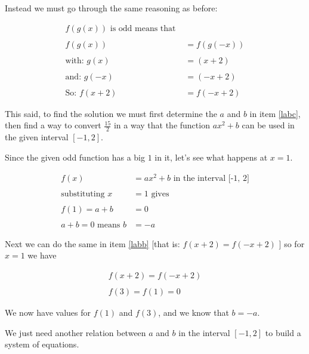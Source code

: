 \begin{enumerate}
Instead we must go through the same reasoning as before:

\begin{equation}
\begin{split}
f(g(x))\textrm{ is odd means that }\\
\\
f(g(x))&=f(g(-x))\\
\\
\textrm{with: } g(x)&=(x+2)\\
\\
\textrm{and: } g(-x)&=(-x+2)\\
\\
\textrm{So: }f(x+2)&=f(-x+2)
\end{split}
\end{equation}


This said, to find the solution we must first determine the $a$ and $b$ in item \ref{labc}, then find a way to convert $\frac{15}{2}$ in a way that the function $ax^2+b$ can be used in the given interval $[-1,2]$.

Since the given odd function has a big $1$ in it, let's see what happens at $x=1$.

\begin{equation}
\begin{split}
f(x) &= ax^2 + b \textrm{ in the interval [-1, 2]} \\
\\
\textrm{substituting } x &= 1 \textrm{ gives} \\
\\
f(1) = a + b &= 0 \\
\\
a+b=0\textrm{ means } b &= -a
\end{split}
\end{equation}

Next we can do the same in item \ref{labb} [that is: $f(x+2)=f(-x+2)$ ] so for $x=1$ we have

\begin{equation}
\begin{split}
f(x+2)=f(-x+2) \\
\\
f(3)=f(1)=0
\end{split}
\end{equation}

We now have values for $f(1)$ and $f(3)$, and we know that $b=-a$.

We just need another relation between $a$ and $b$ in the interval $[ -1, 2 ]$ to build a system of equations.


\end{enumerate}
